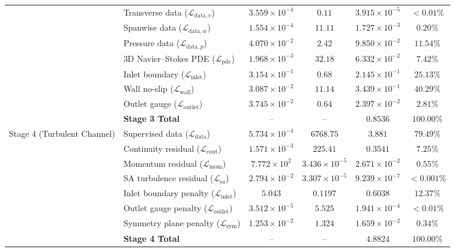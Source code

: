 \documentclass[11pt,a4paper]{article}
\begin{document}
\begin{table}[H]
{\begin{tabular}{llcccc}
& Transverse data ($\mathcal{L}_{\mathrm{data},v}$) & $3.559\times 10^{-4}$ & $0.11$ & $3.915\times 10^{-5}$ & $<0.01\%$ \\
& Spanwise data ($\mathcal{L}_{\mathrm{data},w}$) & $1.554\times 10^{-4}$ & $11.11$ & $1.727\times 10^{-3}$ & $0.20\%$ \\
& Pressure data ($\mathcal{L}_{\mathrm{data},p}$) & $4.070\times 10^{-2}$ & $2.42$ & $9.850\times 10^{-2}$ & $11.54\%$ \\
& 3D Navier--Stokes PDE ($\mathcal{L}_{\mathrm{pde}}$) & $1.968\times 10^{-3}$ & $32.18$ & $6.332\times 10^{-2}$ & $7.42\%$ \\
& Inlet boundary ($\mathcal{L}_{\mathrm{inlet}}$) & $3.154\times 10^{-1}$ & $0.68$ & $2.145\times 10^{-1}$ & $25.13\%$ \\
& Wall no-slip ($\mathcal{L}_{\mathrm{wall}}$) & $3.087\times 10^{-2}$ & $11.14$ & $3.439\times 10^{-1}$ & $40.29\%$ \\
& Outlet gauge ($\mathcal{L}_{\mathrm{outlet}}$) & $3.745\times 10^{-2}$ & $0.64$ & $2.397\times 10^{-2}$ & $2.81\%$ \\
\cmidrule{2-6}
& \textbf{Stage 3 Total} & -- & -- & $\mathbf{0.8536}$ & $\mathbf{100.00\%}$ \\
\midrule
Stage 4 (Turbulent Channel) & Supervised data ($\mathcal{L}_{\mathrm{data}}$) & $5.734\times 10^{-4}$ & $6768.75$ & $3.881$ & $79.49\%$ \\
& Continuity residual ($\mathcal{L}_{\mathrm{cont}}$) & $1.571\times 10^{-3}$ & $225.41$ & $0.3541$ & $7.25\%$ \\
& Momentum residual ($\mathcal{L}_{\mathrm{mom}}$) & $7.772\times 10^{2}$ & $3.436\times 10^{-5}$ & $2.671\times 10^{-2}$ & $0.55\%$ \\
& SA turbulence residual ($\mathcal{L}_{\mathrm{sa}}$) & $2.794\times 10^{-2}$ & $3.307\times 10^{-5}$ & $9.239\times 10^{-7}$ & $<0.001\%$ \\
& Inlet boundary penalty ($\mathcal{L}_{\mathrm{inlet}}$) & $5.043$ & $0.1197$ & $0.6038$ & $12.37\%$ \\
& Outlet gauge penalty ($\mathcal{L}_{\mathrm{outlet}}$) & $3.512\times 10^{-5}$ & $5.525$ & $1.941\times 10^{-4}$ & $<0.01\%$ \\
& Symmetry plane penalty ($\mathcal{L}_{\mathrm{sym}}$) & $1.253\times 10^{-2}$ & $1.324$ & $1.659\times 10^{-2}$ & $0.34\%$ \\
\cmidrule{2-6}
& \textbf{Stage 4 Total} & -- & -- & $\mathbf{4.8824}$ & $\mathbf{100.00\%}$ \\
\midrule

\end{tabular}}
\end{table}
\end{document}
